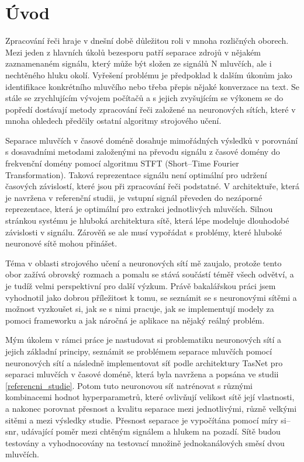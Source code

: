 \chapter{Úvod}
Zpracování řeči hraje v dnešní době důležitou roli v mnoha rozličných oborech. Mezi jeden z hlavních úkolů bezesporu patří separace zdrojů v nějakém zaznamenaném signálu, který může být složen ze signálů N mluvčích, ale i nechtěného hluku okolí. Vyřešení problému je předpoklad k dalším úkonům jako identifikace konkrétního mluvčího nebo třeba přepis nějaké konverzace na text. Se stále se zrychlujícím vývojem počítačů a s jejich zvyšujícím se výkonem se do popředí dostávají metody zpracování řeči založené na neuronových sítích, které v mnoha ohledech předčily ostatní algoritmy strojového učení.

Separace mluvčích v časové doméně dosahuje mimořádných výsledků v porovnání s dosavadními metodami  založenými na převodu signálu z časové domény do frekvenční domény pomocí algoritmu STFT (Short--Time Fourier Transformation). Taková reprezentace signálu není optimální pro udržení časových závislostí, které jsou při zpracování řeči podstatné. V architektuře, která je navržena v referenční studii, je vstupní signál převeden do nezáporné reprezentace, která je optimální pro extrakci jednotlivých mluvčích. Silnou stránkou systému je hluboká architektura sítě, která lépe modeluje dlouhodobé závislosti v signálu. Zárověň se ale musí vypořádat s problémy, které hluboké neuronové sítě mohou přinášet.

Téma v oblasti strojového učení a neuronových sítí mě zaujalo, protože tento obor zažívá obrovský rozmach a pomalu se stává součástí téměř všech odvětví, a je tudíž velmi perspektivní pro další výzkum. Právě bakalářskou práci jsem vyhodnotil jako dobrou příležitost k tomu, se seznámit se s neuronovými sítěmi a možnost vyzkoušet si, jak se s nimi pracuje, jak se implementují modely za pomoci frameworku a jak náročná je aplikace na nějaký reálný problém.

Mým úkolem v rámci práce je nastudovat si problematiku neuronových sítí a jejich základní principy, seznámit se problémem separace mluvčích pomocí neuronových sítí a následně implementovat síť podle architektury TasNet pro separaci mluvčích v časové doméně, která byla navržena a popsána ve studii \ref{referencni_studie}. Potom tuto neuronovou síť natrénovat s různými kombinacemi hodnot hyperparametrů, které ovlivňují velikost sítě  její vlastnosti, a nakonec porovnat přesnost a kvalitu separace mezi jednotlivými, různě velkými sitěmi a mezi výsledky studie. Přesnost separace je vypočítána pomocí míry si--snr, udávající poměr mezi chtěným signálem a hlukem na pozadí. Sítě budou testovány a vyhodnocovány na testovací množině jednokanálových směsí dvou mluvčích.

